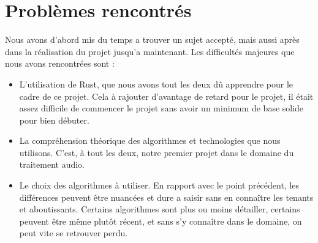 \documentclass{article}
\begin{document}
\section*{Problèmes rencontrés}
Nous avons d'abord mis du temps a trouver un sujet accepté, mais aussi après dans la réalisation du projet jusqu'a maintenant. Les difficultés majeures que nous avons rencontrées sont :
\begin{itemize}
  \item L'utilisation de Rust, que nous avons tout les deux dû apprendre pour le cadre de ce projet. Cela à rajouter d'avantage de retard pour le projet, il était assez difficile de commencer le projet
  sans avoir un minimum de base solide pour bien débuter.
  \item La compréhension théorique des algorithmes et technologies que nous utilisons. C'est, à tout les deux, notre premier projet dans le domaine du traitement audio.
  \item Le choix des algorithmes à utiliser. En rapport avec le point précédent, les différences peuvent être nuancées et dure a saisir sans en connaître les tenants et aboutissants. Certains algorithmes sont
  plus ou moins détailler, certains peuvent être même plutôt récent, et sans s'y connaître dans le domaine, on peut vite se retrouver perdu.
\end{itemize}
\end{document}
